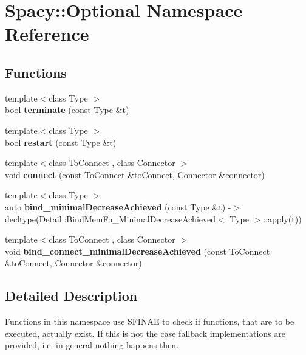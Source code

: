 \hypertarget{namespaceSpacy_1_1Optional}{}\section{Spacy\+:\+:Optional Namespace Reference}
\label{namespaceSpacy_1_1Optional}
\subsection*{Functions}
\begin{DoxyCompactItemize}
\item 
{\footnotesize template$<$class Type $>$ }\\bool {\bfseries terminate} (const Type \&t)\hypertarget{namespaceSpacy_1_1Optional_afc94d50f5d9d1b2b53b374d58fc0089f}{}\label{namespaceSpacy_1_1Optional_afc94d50f5d9d1b2b53b374d58fc0089f}

\item 
{\footnotesize template$<$class Type $>$ }\\bool {\bfseries restart} (const Type \&t)\hypertarget{namespaceSpacy_1_1Optional_af964261e6d0480bfad637d1f707b3777}{}\label{namespaceSpacy_1_1Optional_af964261e6d0480bfad637d1f707b3777}

\item 
{\footnotesize template$<$class To\+Connect , class Connector $>$ }\\void {\bfseries connect} (const To\+Connect \&to\+Connect, Connector \&connector)\hypertarget{namespaceSpacy_1_1Optional_a5569f8a0db2de323799450dd8fd0b4f2}{}\label{namespaceSpacy_1_1Optional_a5569f8a0db2de323799450dd8fd0b4f2}

\item 
{\footnotesize template$<$class Type $>$ }\\auto {\bfseries bind\+\_\+minimal\+Decrease\+Achieved} (const Type \&t) -\/$>$ decltype(Detail\+::\+Bind\+Mem\+Fn\+\_\+\+Minimal\+Decrease\+Achieved$<$ Type $>$\+::apply(t))\hypertarget{namespaceSpacy_1_1Optional_aaf8f2367a615f3b96004b743695719e4}{}\label{namespaceSpacy_1_1Optional_aaf8f2367a615f3b96004b743695719e4}

\item 
{\footnotesize template$<$class To\+Connect , class Connector $>$ }\\void {\bfseries bind\+\_\+connect\+\_\+minimal\+Decrease\+Achieved} (const To\+Connect \&to\+Connect, Connector \&connector)\hypertarget{namespaceSpacy_1_1Optional_aec6afd5b7d50849fcbc842976b82c267}{}\label{namespaceSpacy_1_1Optional_aec6afd5b7d50849fcbc842976b82c267}

\end{DoxyCompactItemize}


\subsection{Detailed Description}
Functions in this namespace use S\+F\+I\+N\+AE to check if functions, that are to be executed, actually exist. If this is not the case fallback implementations are provided, i.\+e. in general nothing happens then. 